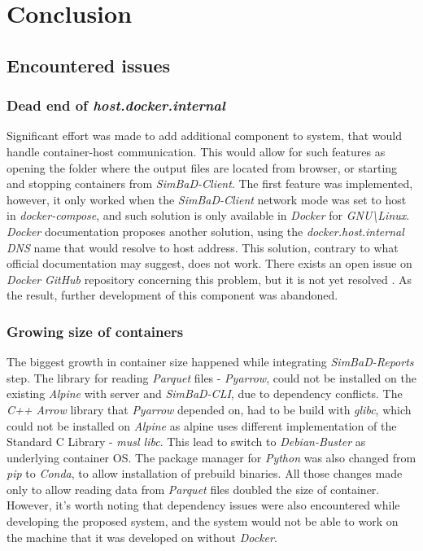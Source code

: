 \chapter{Conclusion}
\label{chapter:6}
\section{Encountered issues}
\subsection{Dead end of \textit{host.docker.internal}}
Significant effort was made to add additional component to system, that would handle container-host communication. This would allow for such features as opening the folder where the output files are located from browser, or starting and stopping containers from \textit{SimBaD-Client}. The first feature was implemented, however, it only worked when the \textit{SimBaD-Client} network mode was set to host in \textit{docker-compose}, and such solution is only available in \textit{Docker} for \textit{GNU\textbackslash Linux}. \textit{Docker} documentation proposes another solution, using the \textit{docker.host.internal} \textit{DNS} name that would resolve to host address. This solution, contrary to what official documentation may suggest, does not work. There exists an open issue on \textit{Docker} \textit{GitHub} repository concerning this problem, but it is not yet resolved \cite{DockerfileIssue}. As the result, further development of this component was abandoned.
\subsection{Growing size of containers}
The biggest growth in container size happened while integrating \textit{SimBaD-Reports} step. The library for reading \textit{Parquet} files - \textit{Pyarrow}, could not be installed on the existing \textit{Alpine} with server and \textit{SimBaD-CLI}, due to dependency conflicts. The \textit{C++ Arrow} library that \textit{Pyarrow} depended on, had to be build with \textit{glibc}, which could not be installed on \textit{Alpine} as alpine uses different implementation of the Standard C Library - \textit{musl libc}. This lead to switch to \textit{Debian-Buster} as underlying container OS. The package manager for \textit{Python} was also changed from \textit{pip} to \textit{Conda}, to allow installation of prebuild binaries.
All those changes made only to allow reading data from \textit{Parquet} files doubled the size of container. However, it's worth noting that dependency issues were also encountered while developing the proposed system, and the system would not be able to work on the machine that it was developed on without \textit{Docker}.
